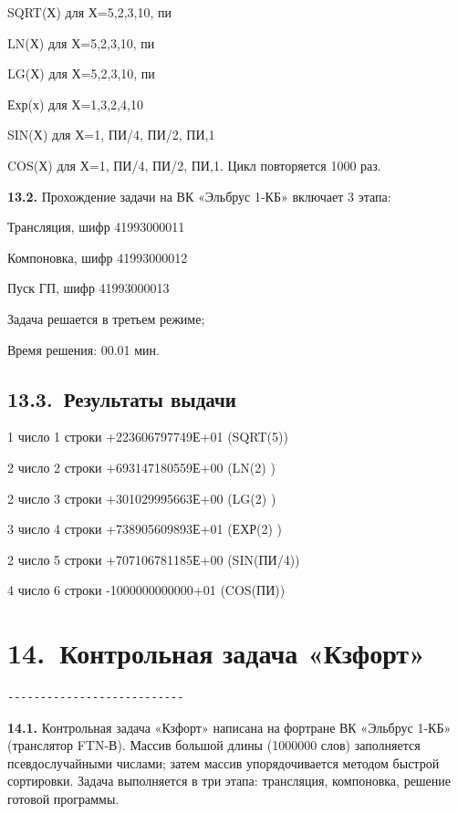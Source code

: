 \documentclass[11pt,a4paper]{article}
\begin{document}
SQRT(Х) для Х=5,2,3,10, пи

LN(Х) для Х=5,2,3,10, пи

LG(Х) для Х=5,2,3,10, пи

Ехр(х) для Х=1,3,2,4,10

SIN(Х) для Х=1, ПИ/4, ПИ/2, ПИ,1

COS(Х) для Х=1, ПИ/4, ПИ/2, ПИ,1. Цикл повторяется 1000 раз.

\par\textbf{13.2.} Прохождение задачи на ВК «Эльбрус 1-КБ» включает 3 этапа:\par
Трансляция, шифр 41993000011

Компоновка, шифр 41993000012

Пуск ГП, шифр 41993000013

Задача решается в третьем режиме;

Время решения: 00.01 мин.

\subsection*{13.3.~Результаты выдачи}
1 число 1 строки +223606797749Е+01 (SQRT(5))

2 число 2 строки +693147180559Е+00 (LN(2) )

2 число 3 строки +301029995663Е+00 (LG(2) )

3 число 4 строки +738905609893Е+01 (ЕХР(2) )

2 число 5 строки +707106781185Е+00 (SIN(ПИ/4))

4 число 6 строки -1000000000000+01 (COS(ПИ))

\section*{14.~Контрольная задача «Кзфорт»}
\begin{center}\small
\begin{BVerbatim}
---------------------------
\end{BVerbatim}
\end{center}

\par\textbf{14.1.} Контрольная задача «Кзфорт» написана на фортране ВК «Эльбрус 1-КБ» (транслятор FTN-В). Массив большой длины (1000000 слов) заполняется псевдослучайными числами; затем массив упорядочивается методом быстрой сортировки. Задача выполняется в три этапа: трансляция, компоновка, решение готовой программы.\par
\end{document}
